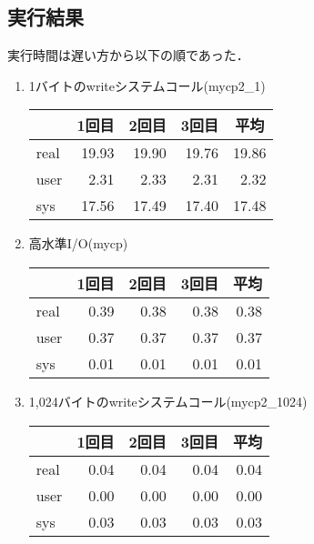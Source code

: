 \documentclass[a4j,twcolumn,11pt,nomag]{ltjarticle}      %
\begin{document}
\subsection*{実行結果}
実行時間は遅い方から以下の順であった．
\begin{enumerate}
\item 1バイトのwriteシステムコール(mycp2\_1)
  \begin{center}
    \begin{tabular}{|l | r | r | r | r |} \hline
      & \multicolumn{1}{|c|}{1回目}
      & \multicolumn{1}{|c|}{2回目}
      & \multicolumn{1}{|c|}{3回目}
      & \multicolumn{1}{|c|}{平均} \\\hline\hline
      real & 19.93 & 19.90 & 19.76 & 19.86 \\\hline
      user &  2.31 &  2.33 &  2.31 &  2.32 \\\hline
      sys  & 17.56 & 17.49 & 17.40 & 17.48 \\\hline
    \end{tabular}
  \end{center}
\item 高水準I/O(mycp)
  \begin{center}
    \begin{tabular}{|l | r | r | r | r |} \hline
      & \multicolumn{1}{|c|}{1回目}
      & \multicolumn{1}{|c|}{2回目}
      & \multicolumn{1}{|c|}{3回目}
      & \multicolumn{1}{|c|}{平均} \\\hline\hline
      real & 0.39 & 0.38 & 0.38 & 0.38 \\\hline
      user & 0.37 & 0.37 & 0.37 & 0.37 \\\hline
      sys  & 0.01 & 0.01 & 0.01 & 0.01 \\\hline
    \end{tabular}
  \end{center}
\item 1,024バイトのwriteシステムコール(mycp2\_1024)
  \begin{center}
    \begin{tabular}{|l | r | r | r | r |} \hline
      & \multicolumn{1}{|c|}{1回目}
      & \multicolumn{1}{|c|}{2回目}
      & \multicolumn{1}{|c|}{3回目}
      & \multicolumn{1}{|c|}{平均} \\\hline\hline
      real & 0.04 & 0.04 & 0.04 & 0.04 \\\hline
      user & 0.00 & 0.00 & 0.00 & 0.00 \\\hline
      sys  & 0.03 & 0.03 & 0.03 & 0.03 \\\hline
    \end{tabular}
  \end{center}
\end{enumerate}
\end{document}
